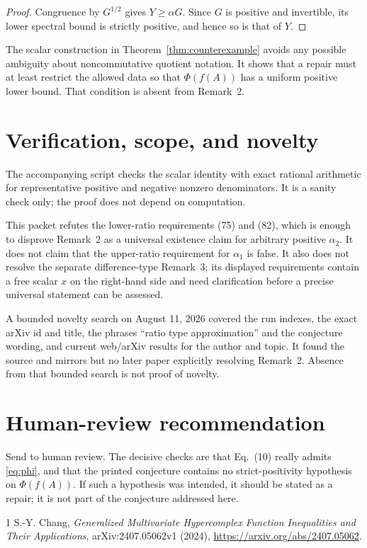 \documentclass[11pt]{article}
\begin{document}
\begin{proof}
Congruence by $G^{1/2}$ gives $Y\geq\alpha G$.  Since $G$ is positive and
invertible, its lower spectral bound is strictly positive, and hence so is
that of $Y$.
\end{proof}

The scalar construction in Theorem~\ref{thm:counterexample} avoids any
possible ambiguity about noncommutative quotient notation.  It shows that a
repair must at least restrict the allowed data so that $\Phi(f(A))$ has a
uniform positive lower bound.  That condition is absent from Remark~2.

\section*{Verification, scope, and novelty}
The accompanying script checks the scalar identity with exact rational
arithmetic for representative positive and negative nonzero denominators.
It is a sanity check only; the proof does not depend on computation.

This packet refutes the lower-ratio requirements (75) and (82), which is
enough to disprove Remark~2 as a universal existence claim for arbitrary
positive $\alpha _2$.  It does not claim that the upper-ratio requirement for
$\alpha _1$ is false.  It also does not resolve the separate difference-type
Remark~3; its displayed requirements contain a free scalar $x$ on the
right-hand side and need clarification before a precise universal statement
can be assessed.

A bounded novelty search on August 11, 2026 covered the run indexes, the exact
arXiv id and title, the phrases ``ratio type approximation'' and the
conjecture wording, and current web/arXiv results for the author and topic.
It found the source and mirrors but no later paper explicitly resolving
Remark~2.  Absence from that bounded search is not proof of novelty.

\section*{Human-review recommendation}
Send to human review.  The decisive checks are that Eq.~(10) really admits
\eqref{eq:phi}, and that the printed conjecture contains no strict-positivity
hypothesis on $\Phi(f(A))$.  If such a hypothesis was intended, it should be
stated as a repair; it is not part of the conjecture addressed here.

\begin{thebibliography}{1}
S.-Y. Chang,
\emph{Generalized Multivariate Hypercomplex Function Inequalities and Their Applications},
arXiv:2407.05062v1 (2024),
\url{https://arxiv.org/abs/2407.05062}.
\end{thebibliography}
\end{document}
